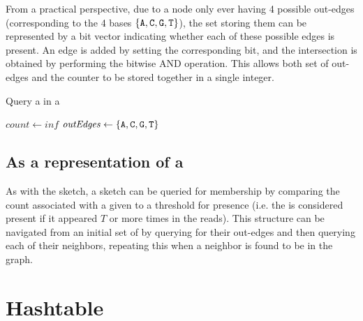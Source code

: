 From a practical perspective, due to a node only ever having 4 possible out-edges (corresponding to the 4 bases $\{\mathtt{A}, \mathtt{C}, \mathtt{G}, \mathtt{T}\}$),
the set storing them can be represented by a bit vector indicating whether each of these possible edges is present. An edge is added
by setting the corresponding bit, and the intersection is obtained by performing the bitwise AND operation. This allows both set of
out-edges and the counter to be stored together in a single integer.  

\begin{algorithm}
    \caption{Query a \kmer in a \dBCM}\label{alg:query}
    $\mathit{count} \gets \mathit{inf}$\;
    $\mathit{outEdges} \gets \{\mathtt{A}, \mathtt{C}, \mathtt{G}, \mathtt{T}\}$\;
\end{algorithm}

\subsection{As a representation of a \dBG}

As with the \cm sketch, a \dBCM sketch can be queried for membership by comparing the count associated with a given \kmer to a threshold
for presence (i.e. the \kmer is considered present if it appeared $T$ or more times in the reads). This structure can be navigated from
an initial set of \kmers by querying for their out-edges and then querying each of their neighbors, repeating this when a neighbor is
found to be in the graph. 

\section{Hashtable}
\label{sec:debruijnhashtable}

